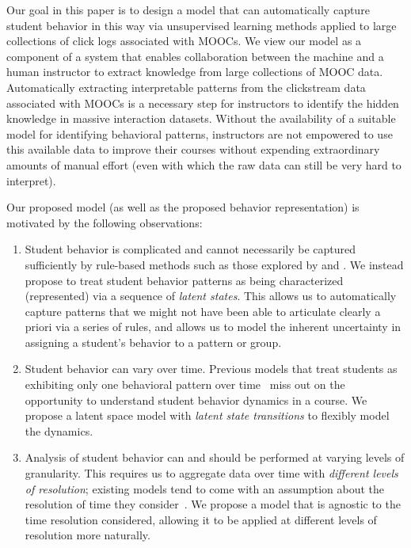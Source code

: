 Our goal in this paper is to design a model that can automatically capture
student behavior in this way via unsupervised learning methods applied to
large collections of click logs associated with MOOCs. We view our model
as a component of a system that enables collaboration between the machine
and a human instructor to extract knowledge from large collections of
MOOC data. Automatically extracting interpretable patterns from the
clickstream data associated with MOOCs is a necessary step for instructors
to identify the hidden knowledge in massive interaction datasets. Without
the availability of a suitable model for identifying behavioral patterns,
instructors are not empowered to use this available data to improve their
courses without expending extraordinary amounts of manual effort (even with
which the raw data can still be very hard to interpret).

Our proposed model (as well as the proposed behavior representation) is
motivated by the following observations:
\begin{enumerate}
  \item Student behavior is complicated and cannot necessarily be captured
      sufficiently by rule-based methods such as those explored by
      \citet{Kizilcec:2013:LAK} and \citet{Davis:2016:EDM}. We instead
      propose to treat student behavior patterns as being characterized
      (represented) via a sequence of \emph{latent states}. This allows us
      to automatically capture patterns that we might not have been able to
      articulate clearly a priori via a series of rules, and allows us to
      model the inherent uncertainty in assigning a student's behavior to a
      pattern or group.
  \item Student behavior can vary over time. Previous models that treat
      students as exhibiting only one behavioral pattern over
      time~\cite{Faucon:2016:EDM} miss out on the opportunity to understand
      student behavior dynamics in a course. We propose a latent space model
      with \emph{latent state transitions} to flexibly model the dynamics.
  \item Analysis of student behavior can and should be performed at varying
      levels of granularity. This requires us to aggregate data over time
      with \emph{different levels of resolution}; existing models tend to come
      with an assumption about the resolution of time they
      consider~\cite{Faucon:2016:EDM, Kizilcec:2013:LAK, Shih:2010:EDM}. We
      propose a model that is agnostic to the time resolution considered,
      allowing it to be applied at different levels of resolution more
      naturally.
\end{enumerate}

